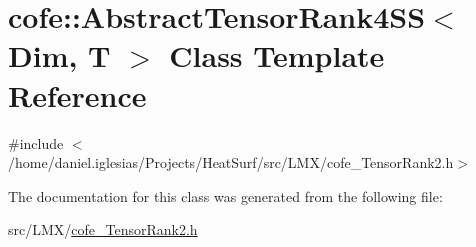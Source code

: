 \hypertarget{classcofe_1_1AbstractTensorRank4SS}{\section{cofe\-:\-:Abstract\-Tensor\-Rank4\-S\-S$<$ Dim, T $>$ Class Template Reference}
\label{classcofe_1_1AbstractTensorRank4SS}
}


{\ttfamily \#include $<$/home/daniel.\-iglesias/\-Projects/\-Heat\-Surf/src/\-L\-M\-X/cofe\-\_\-\-Tensor\-Rank2.\-h$>$}



The documentation for this class was generated from the following file\-:\begin{DoxyCompactItemize}
\item 
src/\-L\-M\-X/\hyperlink{cofe__TensorRank2_8h}{cofe\-\_\-\-Tensor\-Rank2.\-h}\end{DoxyCompactItemize}
